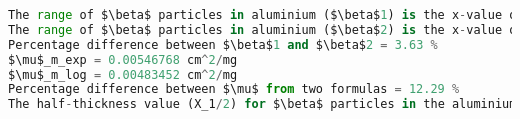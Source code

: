 \documentclass[a4paper,11pt]{article}
\begin{document}
\begin{lstlisting}[language=Python]
The range of $\beta$ particles in aluminium ($\beta$1) is the x-value of intersection points of first graph: 654.41 mg/cm^2
The range of $\beta$ particles in aluminium ($\beta$2) is the x-value of intersection points of second graph: 678.61 mg/cm^2
Percentage difference between $\beta$1 and $\beta$2 = 3.63 %
$\mu$_m_exp = 0.00546768 cm^2/mg
$\mu$_m_log = 0.00483452 cm^2/mg
Percentage difference between $\mu$ from two formulas = 12.29 %
The half-thickness value (X_1/2) for $\beta$ particles in the aluminium absorber ($\beta$2) is 143.37 mg/cm^2
\end{lstlisting}
\end{document}
